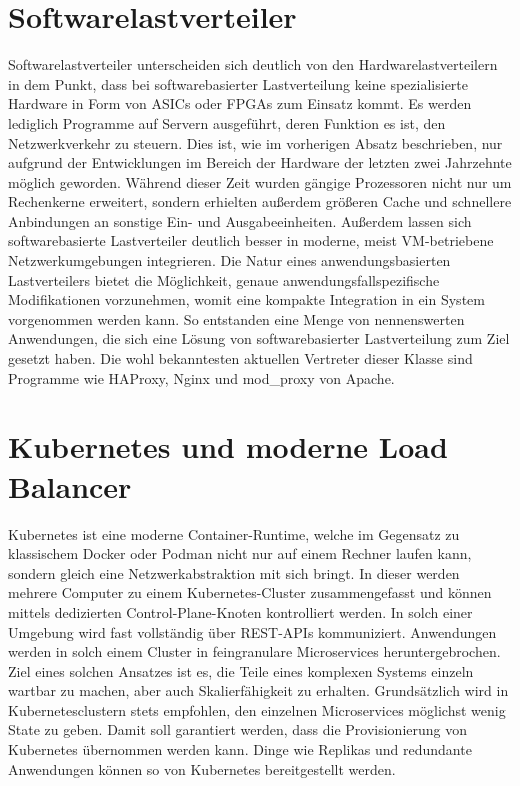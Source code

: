 \section{Softwarelastverteiler}
Softwarelastverteiler unterscheiden sich deutlich von den Hardwarelastverteilern in dem Punkt, dass bei softwarebasierter Lastverteilung keine spezialisierte Hardware in Form von ASICs oder FPGAs zum Einsatz kommt. Es werden lediglich Programme auf Servern ausgeführt, deren Funktion es ist, den Netzwerkverkehr zu steuern. Dies ist, wie im vorherigen Absatz beschrieben, nur aufgrund der Entwicklungen im Bereich der Hardware der letzten zwei Jahrzehnte möglich geworden. Während dieser Zeit wurden gängige Prozessoren nicht nur um Rechenkerne erweitert, sondern erhielten außerdem größeren Cache und schnellere Anbindungen an sonstige Ein- und Ausgabeeinheiten. Außerdem lassen sich softwarebasierte Lastverteiler deutlich besser in moderne, meist VM-betriebene Netzwerkumgebungen integrieren. Die Natur eines anwendungsbasierten Lastverteilers bietet die Möglichkeit, genaue anwendungsfallspezifische Modifikationen vorzunehmen, womit eine kompakte Integration in ein System vorgenommen werden kann. So entstanden eine Menge von nennenswerten Anwendungen, die sich eine Lösung von softwarebasierter Lastverteilung zum Ziel gesetzt haben. Die wohl bekanntesten aktuellen Vertreter dieser Klasse sind Programme wie HAProxy, Nginx und mod\_proxy von Apache.
\section{Kubernetes und moderne Load Balancer}
Kubernetes ist eine moderne Container-Runtime, welche im Gegensatz zu klassischem Docker oder Podman nicht nur auf einem Rechner laufen kann, sondern gleich eine Netzwerkabstraktion mit sich bringt. In dieser werden mehrere Computer zu einem Kubernetes-Cluster zusammengefasst und können mittels dedizierten Control-Plane-Knoten kontrolliert werden. In solch einer Umgebung wird fast vollständig über REST-APIs kommuniziert. Anwendungen werden in solch einem Cluster in feingranulare Microservices heruntergebrochen. Ziel eines solchen Ansatzes ist es, die Teile eines komplexen Systems einzeln wartbar zu machen, aber auch Skalierfähigkeit zu erhalten. Grundsätzlich wird in Kubernetesclustern stets empfohlen, den einzelnen Microservices möglichst wenig State zu geben. Damit soll garantiert werden, dass die Provisionierung von Kubernetes übernommen werden kann. Dinge wie Replikas und redundante Anwendungen können so von Kubernetes bereitgestellt werden. 

